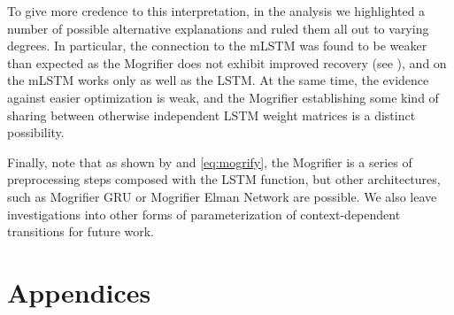 To give more credence to this interpretation, in the analysis we
highlighted a number of possible alternative explanations and ruled
them all out to varying degrees.
%
In particular, the connection to the mLSTM was found to be weaker than
expected as the Mogrifier does not exhibit improved recovery (see
), and on \ptb the mLSTM
works only as well as the LSTM.
%
At the same time, the evidence against easier optimization is weak,
and the Mogrifier establishing some kind of sharing between otherwise
independent LSTM weight matrices is a distinct possibility.

Finally, note that as shown by  and
\eqref{eq:mogrify}, the Mogrifier is a series of preprocessing
steps composed with the LSTM function, but other architectures, such
as Mogrifier GRU or Mogrifier Elman Network are possible.
%
We also leave investigations into other forms of parameterization of
context-dependent transitions for future work.

\mglsep

\chapter*{Appendices}

